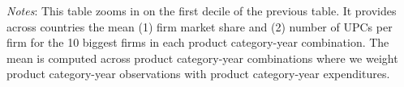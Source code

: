 \begin{table}[H]
	\centering		
	\caption{Size Distribution by firm rank} 
    \label{tab: app_bars_firms_size_top}
	\begin{spacing}{1.1}
    \end{spacing}
    \parbox{\textwidth}{
        \begin{spacing}{1} 
            {\footnotesize 
            \textit{Notes}: This table zooms in on the first decile of the previous table. It provides across countries the mean (1) firm market share and (2) number of UPCs per firm for the 10 biggest firms in each product category-year combination. The mean is computed across product category-year combinations where we weight product category-year observations with product category-year expenditures. }
        \end{spacing}}
\end{table}

